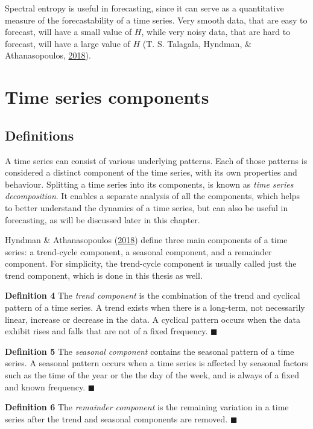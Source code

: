 \documentclass[12pt,oneside]{reedthesis}
\begin{document}
Spectral entropy is useful in forecasting, since it can serve as a
quantitative measure of the forecastability of a time series. Very
smooth data, that are easy to forecast, will have a small value of
\(H\), while very noisy data, that are hard to forecast, will have a
large value of \(H\) (T. S. Talagala, Hyndman, \& Athanasopoulos,
\protect\hyperlink{ref-talagala2018}{2018}).

\section{Time series components}\label{time-series-components}

\subsection{Definitions}\label{definitions}

A time series can consist of various underlying patterns. Each of those
patterns is considered a distinct component of the time series, with its
own properties and behaviour. Splitting a time series into its
components, is known as \emph{time series decomposition}. It enables a
separate analysis of all the components, which helps to better
understand the dynamics of a time series, but can also be useful in
forecasting, as will be discussed later in this chapter.

Hyndman \& Athanasopoulos (\protect\hyperlink{ref-hyndman2018fpp}{2018})
define three main components of a time series: a trend-cycle component,
a seasonal component, and a remainder component. For simplicity, the
trend-cycle component is usually called just the trend component, which
is done in this thesis as well.

\textbf{Definition 4} The \emph{trend component} is the combination of
the trend and cyclical pattern of a time series. A trend exists when
there is a long-term, not necessarily linear, increase or decrease in
the data. A cyclical pattern occurs when the data exhibit rises and
falls that are not of a fixed frequency. \(\blacksquare\)

\textbf{Definition 5} The \emph{seasonal component} contains the
seasonal pattern of a time series. A seasonal pattern occurs when a time
series is affected by seasonal factors such as the time of the year or
the the day of the week, and is always of a fixed and known frequency.
\(\blacksquare\)

\textbf{Definition 6} The \emph{remainder component} is the remaining
variation in a time series after the trend and seasonal components are
removed. \(\blacksquare\)
\end{document}
